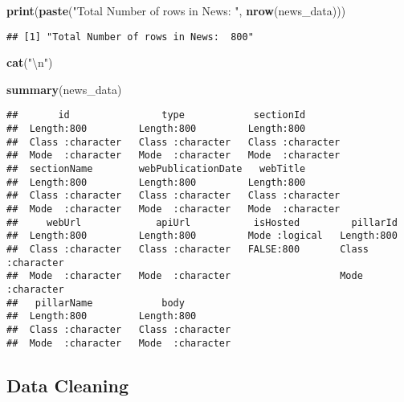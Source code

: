 \documentclass[]{article}
\newenvironment{Shaded}{\begin{snugshade}}{\end{snugshade}}
\newcommand{\KeywordTok}[1]{\textcolor[rgb]{0.13,0.29,0.53}{\textbf{#1}}}
\newcommand{\CharTok}[1]{\textcolor[rgb]{0.31,0.60,0.02}{#1}}
\newcommand{\StringTok}[1]{\textcolor[rgb]{0.31,0.60,0.02}{#1}}
\newcommand{\NormalTok}[1]{#1}
\begin{document}
\begin{Shaded}
\begin{Highlighting}[]
\KeywordTok{print}\NormalTok{(}\KeywordTok{paste}\NormalTok{(}\StringTok{"Total Number of rows in News: "}\NormalTok{, }
    \KeywordTok{nrow}\NormalTok{(news_data)))}
\end{Highlighting}
\end{Shaded}

\begin{verbatim}
## [1] "Total Number of rows in News:  800"
\end{verbatim}

\begin{Shaded}
\begin{Highlighting}[]
\KeywordTok{cat}\NormalTok{(}\StringTok{"}\CharTok{\textbackslash{}n}\StringTok{"}\NormalTok{)}
\end{Highlighting}
\end{Shaded}

\begin{Shaded}
\begin{Highlighting}[]
\KeywordTok{summary}\NormalTok{(news_data)}
\end{Highlighting}
\end{Shaded}

\begin{verbatim}
##       id                type            sectionId        
##  Length:800         Length:800         Length:800        
##  Class :character   Class :character   Class :character  
##  Mode  :character   Mode  :character   Mode  :character  
##  sectionName        webPublicationDate   webTitle        
##  Length:800         Length:800         Length:800        
##  Class :character   Class :character   Class :character  
##  Mode  :character   Mode  :character   Mode  :character  
##     webUrl             apiUrl           isHosted         pillarId        
##  Length:800         Length:800         Mode :logical   Length:800        
##  Class :character   Class :character   FALSE:800       Class :character  
##  Mode  :character   Mode  :character                   Mode  :character  
##   pillarName            body          
##  Length:800         Length:800        
##  Class :character   Class :character  
##  Mode  :character   Mode  :character
\end{verbatim}

\subsection{Data Cleaning}\label{data-cleaning}
\end{document}
